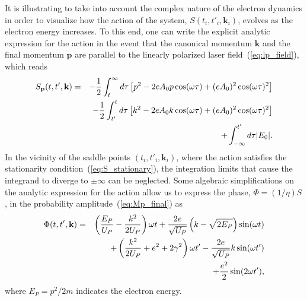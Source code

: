 It is illustrating to take into account the complex nature of the
electron dynamics in order to visualize how the action of the system,
$S(t_{i},t'_{i},\mathbf{k}_{i})$, evolves as the electron energy
increases. To this end, one can write the explicit analytic expression
for the action in the event that the canonical momentum $\mathbf{k}$
and the final momentum $\mathbf{p}$ are parallel to the linearly
polarized laser field~(\ref{eq:lp_field}), which reads
%
\begin{eqnarray}
  \label{eq:action_analytic}
S_{\bf{p}}(t, t', \bf{k}) & = &
-\frac{1}{2} \int_{t}^{\infty} d\tau\left[ p^{2}
- 2eA_{0}p\cos(\omega\tau) + (eA_{0})^{2}\cos(\omega\tau)^{2} \right]\nonumber\\
&& -\frac{1}{2} \int_{t'}^{t} d\tau\left[k^{2}
- 2eA_{0}k\cos(\omega\tau) + (eA_{0})^{2}\cos(\omega\tau)^{2} \right]\nonumber\\
&& + \int_{-\infty}^{t'} d\tau|E_{0}|.
\end{eqnarray}
%
In the vicinity of the saddle points $(t_{i},t'_{i},\mathbf{k}_{i})$,
where the action satisfies the stationarity
condition~(\ref{eq:S_stationary}), the integration limits that cause
the integrand to diverge to $\pm\infty$ can be neglected. Some
algebraic simplifications on the analytic expression for the action
allow us to express the phase, $\Phi = (1/\eta)S$, in the probability
amplitude~(\ref{eq:Mp_final}) as
%
\begin{eqnarray}
  \label{eq:phase_final}
\Phi(t, t', \bf{k}) & = &
\left(\frac{E_{P}}{U_{P}} - \frac{k^{2}}{2U_{P}}\right) \omega t
+ \frac{2e}{\sqrt{U_{P}}} \left( k - \sqrt{2E_{P}}\right) \sin(\omega t) \nonumber\\
&&
+ \left( \frac{k^{2}}{2U_{P}} + e^{2}+2\gamma^{2} \right)\omega t'
- \frac{2e}{\sqrt{U_{P}}} k\sin(\omega t') \nonumber\\
&&
+ \frac{e^2}{2}\sin(2\omega t'),
\end{eqnarray}
%
where $E_{P} = p^{2}/2m$ indicates the electron energy.


